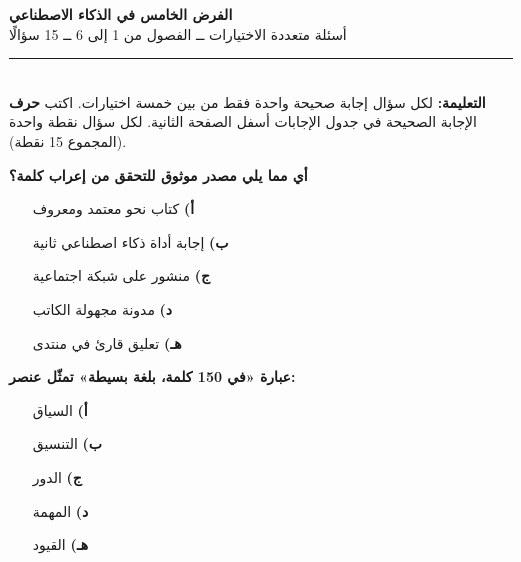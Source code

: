 \documentclass[11pt,a4paper]{article}
\begin{document}
\begin{center}
{\Large\khatt\textbf{الفرض الخامس في الذكاء الاصطناعي}}\\[2pt]
{\normalsize أسئلة متعددة الاختيارات ــ الفصول من 1 إلى 6 ــ 15 سؤالًا}
\end{center}
\vspace{-4pt}\rule{\textwidth}{0.6pt}\\
{\small\textbf{التعليمة:} لكل سؤال إجابة صحيحة واحدة فقط من بين خمسة اختيارات.
اكتب \textbf{حرف} الإجابة الصحيحة في جدول الإجابات أسفل الصفحة الثانية.
لكل سؤال نقطة واحدة (المجموع 15 نقطة).}
\vspace{-2pt}
\begin{multicols}{2}

\noindent\begin{minipage}{\linewidth}
\hangindent=0.7cm\textbf{أي مما يلي مصدر موثوق للتحقق من إعراب كلمة؟}
\begin{itemize}[leftmargin=0.95cm, labelsep=4pt, itemsep=0pt, topsep=2pt, parsep=0pt]
  \item[\textbf{أ)}] كتاب نحو معتمد ومعروف
  \item[\textbf{ب)}] إجابة أداة ذكاء اصطناعي ثانية
  \item[\textbf{ج)}] منشور على شبكة اجتماعية
  \item[\textbf{د)}] مدونة مجهولة الكاتب
  \item[\textbf{هـ)}] تعليق قارئ في منتدى
\end{itemize}
\end{minipage}\par\vspace{7pt plus 4pt}
\noindent\begin{minipage}{\linewidth}
\hangindent=0.7cm\textbf{عبارة «في 150 كلمة، بلغة بسيطة» تمثّل عنصر:}
\begin{itemize}[leftmargin=0.95cm, labelsep=4pt, itemsep=0pt, topsep=2pt, parsep=0pt]
  \item[\textbf{أ)}] السياق
  \item[\textbf{ب)}] التنسيق
  \item[\textbf{ج)}] الدور
  \item[\textbf{د)}] المهمة
  \item[\textbf{هـ)}] القيود
\end{itemize}
\end{minipage}\par\vspace{7pt plus 4pt}
\noindent\begin{minipage}{\linewidth}

\end{minipage}
\end{multicols}
\end{document}
